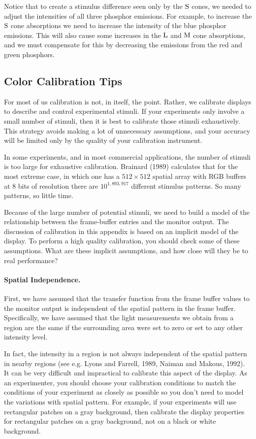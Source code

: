 Notice that to create a stimulus difference seen only by the $\mbox{S}$
cones, we needed to adjust the intensities of all three phosphor
emissions.  For example, to increase the $\mbox{S}$ cone absorptions we
need to increase the intensity of the blue phosphor emissions.
This will also cause some increases in the $\mbox{L}$ and $\mbox{M}$ cone
absorptions, and we must compensate for this by decreasing the
emissions from the red and green phosphors.

\subsection*{Color Calibration Tips}
For most of us calibration is not, in itself, the point.  Rather, we
calibrate displays to describe and control experimental stimuli.  If your
experiments only involve a small number of stimuli, then it is best to
calibrate those stimuli exhaustively.  This strategy avoids making a
lot of unnecessary assumptions, and your accuracy will be limited only
by the quality of your calibration instrument.

In some experiments, and in most commercial applications, the number
of stimuli is too large for exhaustive calibration.  Brainard (1989)
calculates that for the most extreme case, in which one has a $512
\times 512$ spatial array with RGB buffers at $8$ bits of resolution
there are $10 ^{1,893,917}$ different stimulus patterns.  So many
patterns, so little time.

Because of the large number of potential stimuli, we need to build a
model of the relationship between the frame-buffer entries and the
monitor output.  The discussion of calibration in this appendix is
based on an implicit model of the display.  To perform a high quality
calibration, you should check some of these assumptions.  What are
these implicit assumptions, and how close will they be to real
performance?

\paragraph{Spatial Independence.  }
First, we have assumed that the transfer function from the frame
buffer values to the monitor output is independent of the spatial
pattern in the frame buffer.  Specifically, we have assumed that the
light measurements we obtain from a region are the same if the
surrounding area were set to zero or set to any other intensity level.

In fact, the intensity in a region is not always independent of the
spatial pattern in nearby regions (see e.g. Lyons and Farrell, 1989,
Naiman and Makous, 1992).  It can be very difficult and impractical to
calibrate this aspect of the display.  As an experimenter, you should
choose your calibration conditions to match the conditions of your
experiment as closely as possible so you don't need to model the
variations with spatial pattern.  For example, if your experiments
will use rectangular patches on a gray background, then calibrate the
display properties for rectangular patches on a gray background, not
on a black or white background.

